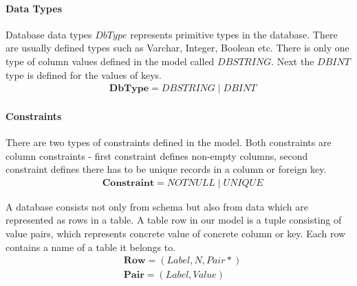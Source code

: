 \documentclass[11pt]{article}
\begin{document}
\paragraph{Data Types} Database data types $DbType$ represents primitive types in the database. There are usually defined types such as Varchar, Integer, Boolean etc. There is only one type of column values defined in the model called $DBSTRING$. Next the $DBINT$ type is defined for the values of keys.
\begin{align*}
&	\mathbf{DbType} = DBSTRING \; | \; DBINT
\end{align*}

\paragraph{Constraints} There are two types of constraints defined in the model. Both constraints are column constraints - first constraint defines non-empty columns, second constraint defines there has to be unique records in a column or foreign key.
\begin{align*}
&	\mathbf{Constraint} = NOTNULL \; | \; UNIQUE 
\end{align*}

A database consists not only from schema but also from data which are represented as rows in a table. A table row in our model is a tuple consisting of value pairs, which represents concrete value of concrete column or key. Each row contains a name of a table it belongs to.
\begin{align*}
&	\mathbf{Row} = (Label, N, Pair*) \\
&	\mathbf{Pair} = (Label, Value) 
\end{align*}

\end{document}
